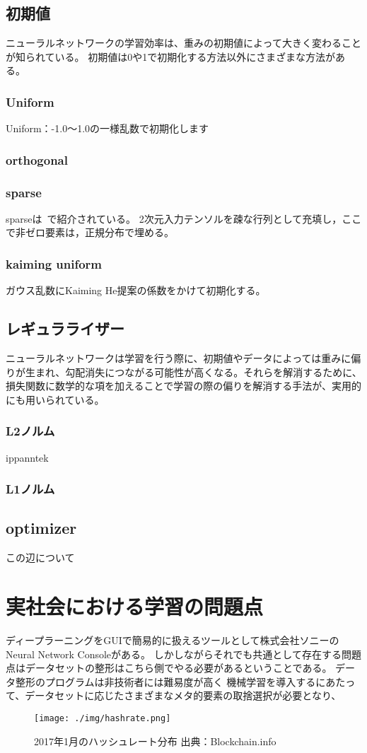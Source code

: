 \subsection{初期値}
ニューラルネットワークの学習効率は、重みの初期値によって大きく変わることが知られている。
初期値は0や1で初期化する方法以外にさまざまな方法がある。

\subsubsection{Uniform}
Uniform：-1.0～1.0の一様乱数で初期化します
\subsubsection{orthogonal}
\subsubsection{sparse}
sparseは~\cite{sim}で紹介されている。
2次元入力テンソルを疎な行列として充填し，ここで非ゼロ要素は，正規分布で埋める。
\subsubsection{kaiming uniform}
ガウス乱数にKaiming He提案の係数をかけて初期化する。

\subsection{レギュラライザー}
ニューラルネットワークは学習を行う際に、初期値やデータによっては重みに偏りが生まれ、勾配消失につながる可能性が高くなる。それらを解消するために、損失関数に数学的な項を加えることで学習の際の偏りを解消する手法が、実用的にも用いられている。
\subsubsection{L2ノルム}
ippanntek
\subsubsection{L1ノルム}

\subsection{optimizer}
この辺について



\section{実社会における学習の問題点}
ディープラーニングをGUIで簡易的に扱えるツールとして株式会社ソニーのNeural Network Consoleがある。
しかしながらそれでも共通として存在する問題点はデータセットの整形はこちら側でやる必要があるということである。
データ整形のプログラムは非技術者には難易度が高く
機械学習を導入するにあたって、データセットに応じたさまざまなメタ的要素の取捨選択が必要となり、

\begin{figure}[h]
    \begin{center}
        \texttt{[image: ./img/hashrate.png]}
        \caption{2017年1月のハッシュレート分布 出典：Blockchain.info\cite{bitcoinhashrate}}
        \label{img:hashrate}
    \end{center}
\end{figure}
\fi
